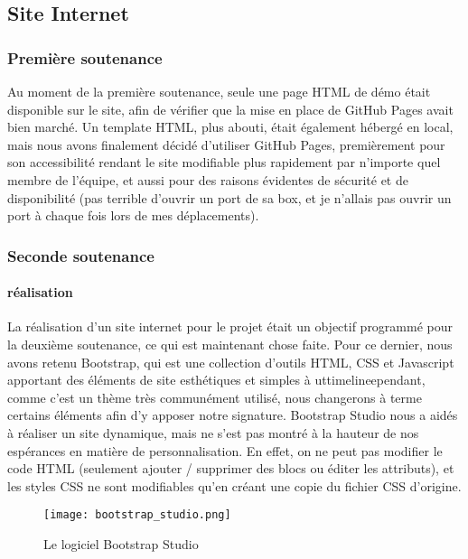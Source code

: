 \subsection{Site Internet}

    \subsubsection{Première soutenance}

        Au moment de la première soutenance, seule une page HTML de démo était disponible sur le site, afin de vérifier 
        que la mise en place de GitHub Pages avait bien marché. Un template HTML, plus abouti, était également hébergé en local, 
        mais nous avons finalement décidé d'utiliser GitHub Pages, premièrement pour son accessibilité rendant le site modifiable 
        plus rapidement par n'importe quel membre de l'équipe, et aussi pour des raisons évidentes de sécurité et de disponibilité 
        (pas terrible d'ouvrir un port de sa box, et je n'allais pas ouvrir un port à chaque fois lors de mes déplacements).

    \subsubsection{Seconde soutenance}

        \paragraph{réalisation}

        La réalisation d'un site internet pour le projet était un objectif
        programmé pour la deuxième soutenance, ce qui est maintenant chose faite.
        Pour ce dernier, nous avons retenu Bootstrap, qui est une collection
        d'outils HTML, CSS et Javascript apportant des éléments de site
        esthétiques et simples à uttimelineependant, comme c'est un thème très 
        communément utilisé, nous changerons à terme certains éléments afin 
        d'y apposer notre signature. Bootstrap Studio nous a aidés à réaliser
        un site dynamique, mais ne s'est pas montré à la hauteur de nos espérances
        en matière de personnalisation. En effet, on ne peut pas modifier
        le code HTML (seulement ajouter / supprimer des blocs ou éditer les
        attributs), et les styles CSS ne sont modifiables qu'en créant une copie
        du fichier CSS d'origine.

        \begin{figure}[hbt!]
            \centering
            \texttt{[image: bootstrap\_studio.png]}
            \caption{Le logiciel Bootstrap Studio}
        \end{figure}

